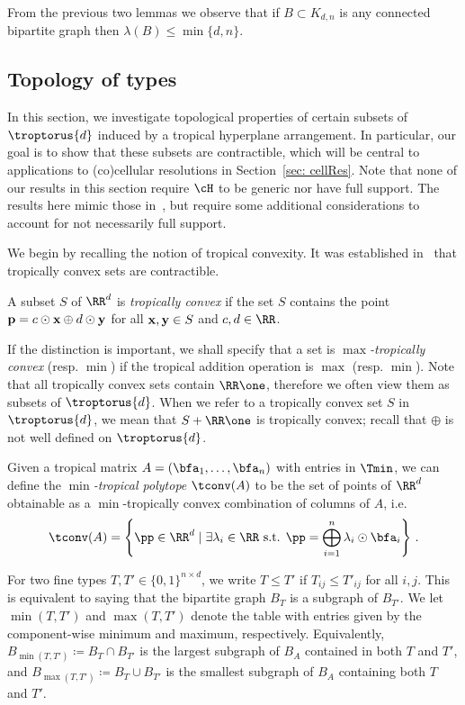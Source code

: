 From the previous two lemmas we observe that if $B \subset K_{d,n}$ is any connected bipartite graph then $\lambda(B) \leq \min\{d,n\}$.

\subsection{Topology of types}\label{sec:type+topology}
In this section, we investigate topological properties of certain subsets of $\troptorus{d}$ induced by a tropical hyperplane arrangement. 
In particular, our goal is to show that these subsets are contractible, which will be central to applications to (co)cellular resolutions in Section~\ref{sec: cellRes}. Note that none of our results in this section require $\cH$ to be generic nor have full support. The results here mimic those in~\cite[Section 2.3]{dochtermann2012tropical}, but require some additional considerations to account for not necessarily full support.

We begin by recalling the notion of tropical convexity. It was established in~\cite[Theorem 2]{develin2004tropical} that tropically convex sets are contractible.

\begin{definition}\label{def: tropConvex} A subset $S$ of $\RR^d$ is \textit{tropically convex} if the set $S$ contains the point ${\bf p} = c\odot {\bf x} \oplus d\odot {\bf y}$ for all ${\bf x},{\bf y} \in S$ and $c,d\in\RR$.
\end{definition}

If the distinction is important, we shall specify that a set is \emph{$\max$-tropically convex} (resp. $\min$) if the tropical addition operation is $\max$ (resp. $\min$).
Note that all tropically convex sets contain $\RR\one$, therefore we often view them as subsets of $\troptorus{d}$.
When we refer to a tropically convex set $S$ in $\troptorus{d}$, we mean that $S + \RR\one$ is tropically convex; recall that $\oplus$ is not well defined on $\troptorus{d}$.

Given a tropical matrix $A = (\bfa_1, \dots, \bfa_n)$ with entries in $\Tmin$, we can define the \emph{$\min$-tropical polytope} $\tconv(A)$ to be the set of points of $\RR^d$ obtainable as a $\min$-tropically convex combination of columns of $A$, i.e.
\[
\tconv(A) = \left\{\pp \in \RR^d \mid \exists \lambda_i \in \RR \text{ s.t. } \pp = \bigoplus_{i=1}^n \lambda_i \odot \bfa_i \right\} \, .
\]

\begin{notation}\label{not: typesPartialOrder} For two fine types $T, T' \in \{0,1\}^{n\times d}$, we write $T\leq T'$ if $T_{ij} \leq T'_{ij}$ for all $i,j$. This is equivalent to saying that the bipartite graph $B_T$ is a subgraph of $B_{T'}$. We let $\min(T,T')$ and $\max(T,T')$ denote the table with entries given by the component-wise minimum and maximum, respectively.
Equivalently, $B_{\min(T,T')}\coloneqq  B_T \cap B_{T'}$ is the largest subgraph of $B_A$ contained in both $T$ and $T'$, and $B_{\max(T,T')}\coloneqq  B_T \cup B_{T'}$ is the smallest subgraph of $B_A$ containing both $T$ and $T'$.
\end{notation}

